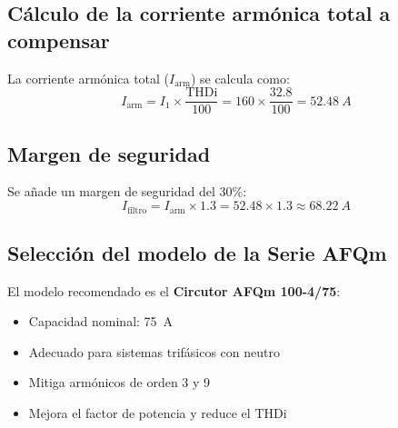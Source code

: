 \documentclass[a4paper,10pt]{article}
\begin{document}
\begin{Form}
\subsection{Cálculo de la corriente armónica total a compensar}
La corriente armónica total (\(I_{\text{arm}}\)) se calcula como:
\[
I_{\text{arm}} = I_1 \times \frac{\text{THDi}}{100} = 160 \times \frac{32.8}{100} = \SI{52.48}{A}
\]

\subsection{Margen de seguridad}
Se añade un margen de seguridad del 30\%:
\[
I_{\text{filtro}} = I_{\text{arm}} \times 1.3 = 52.48 \times 1.3 \approx \SI{68.22}{A}
\]

\subsection{Selección del modelo de la Serie AFQm}
El modelo recomendado es el \textbf{Circutor AFQm 100-4/75}:
\begin{itemize}
    \item Capacidad nominal: \SI{75}{A}
    \item Adecuado para sistemas trifásicos con neutro
    \item Mitiga armónicos de orden 3 y 9
    \item Mejora el factor de potencia y reduce el THDi
\end{itemize}


\end{Form}
\end{document}
